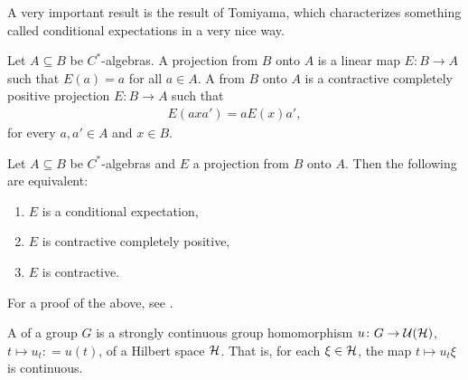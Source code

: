 A very important result is the result of Tomiyama, which characterizes something called conditional expectations in a very nice way.
\begin{definition}
	Let $A \subseteq B$ be $C^*$-algebras. A projection from $B$ onto $A$ is a linear map $E \colon B \to A$ such that $E(a)=a$ for all $a \in A$. A  from $B$ onto $A$ is a contractive completely positive projection $E \colon B \to A$ such that
	\begin{align*}
		E(axa')=a E(x) a',
	\end{align*}
	for every $a,a' \in A$ and $x \in B$.
\end{definition}
\begin{theorem}
	Let $A \subseteq B$ be $C^*$-algebras and $E$ a projection from $B$ onto $A$. Then the following are equivalent:
	\begin{enumerate}
		\item $E$ is a conditional expectation,
		\item $E$ is contractive completely positive,
		\item $E$ is contractive.
	\end{enumerate}
\end{theorem}
For a proof of the above, see \cite[Theorem 1.5.10]{brown2008c}.
\begin{definition}
	A  of a group $G$ is a strongly continuous group homomorphism $u \colon G \to \mathcal{U}(\mathcal{H})$, $t \mapsto u_t: = u(t)$, of a Hilbert space $\mathcal{H}$. That is, for each $\xi \in \mathcal{H}$, the map $t \mapsto u_t \xi$ is continuous. 
\end{definition}

